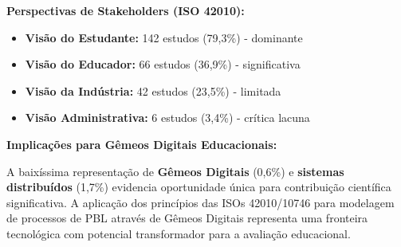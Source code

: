 \documentclass[english, spanish, brazilian]{RBIEarticle} %
\begin{document}
\textbf{Perspectivas de Stakeholders (ISO 42010):}
\begin{itemize}
\item \textbf{Visão do Estudante:} 142 estudos (79,3\%) - dominante
\item \textbf{Visão do Educador:} 66 estudos (36,9\%) - significativa
\item \textbf{Visão da Indústria:} 42 estudos (23,5\%) - limitada
\item \textbf{Visão Administrativa:} 6 estudos (3,4\%) - crítica lacuna
\end{itemize}

\textbf{Implicações para Gêmeos Digitais Educacionais:}

A baixíssima representação de \textbf{Gêmeos Digitais} (0,6\%) e \textbf{sistemas distribuídos} (1,7\%) evidencia oportunidade única para contribuição científica significativa. A aplicação dos princípios das ISOs 42010/10746 para modelagem de processos de PBL através de Gêmeos Digitais representa uma fronteira tecnológica com potencial transformador para a avaliação educacional.


\printbibliography
\end{document}
